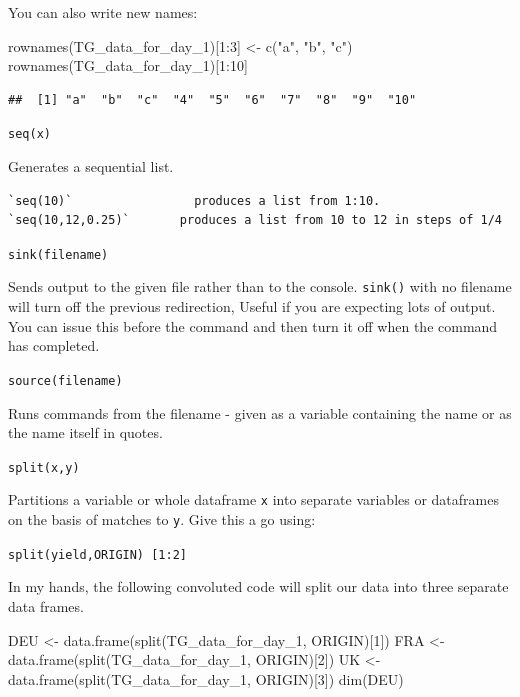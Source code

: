 \documentclass[
]{book}
\newenvironment{Shaded}{\begin{snugshade}}{\end{snugshade}}
\newcommand{\DecValTok}[1]{\textcolor[rgb]{0.00,0.00,0.81}{#1}}
\newcommand{\FunctionTok}[1]{\textcolor[rgb]{0.00,0.00,0.00}{#1}}
\newcommand{\NormalTok}[1]{#1}
\newcommand{\OtherTok}[1]{\textcolor[rgb]{0.56,0.35,0.01}{#1}}
\newcommand{\SpecialCharTok}[1]{\textcolor[rgb]{0.00,0.00,0.00}{#1}}
\newcommand{\StringTok}[1]{\textcolor[rgb]{0.31,0.60,0.02}{#1}}
\begin{document}
You can also write new names:

\begin{Shaded}
\begin{Highlighting}[]
\FunctionTok{rownames}\NormalTok{(TG\_data\_for\_day\_1)[}\DecValTok{1}\SpecialCharTok{:}\DecValTok{3}\NormalTok{] }\OtherTok{\textless{}{-}} \FunctionTok{c}\NormalTok{(}\StringTok{"a"}\NormalTok{, }\StringTok{"b"}\NormalTok{, }\StringTok{"c"}\NormalTok{)}
\FunctionTok{rownames}\NormalTok{(TG\_data\_for\_day\_1)[}\DecValTok{1}\SpecialCharTok{:}\DecValTok{10}\NormalTok{]}
\end{Highlighting}
\end{Shaded}

\begin{verbatim}
##  [1] "a"  "b"  "c"  "4"  "5"  "6"  "7"  "8"  "9"  "10"
\end{verbatim}

\texttt{seq(x)}

Generates a sequential list.

\begin{verbatim}
`seq(10)`                 produces a list from 1:10. 
`seq(10,12,0.25)`       produces a list from 10 to 12 in steps of 1/4
\end{verbatim}

\texttt{sink(filename)}

Sends output to the given file rather than to the console. \texttt{sink()} with no filename will turn off the previous redirection, Useful if you are expecting lots of output. You can issue this before the command and then turn it off when the command has completed.

\texttt{source(filename)}

Runs commands from the filename - given as a variable containing the name or as the name itself in quotes.

\texttt{split(x,y)}

Partitions a variable or whole dataframe \texttt{x} into separate variables or dataframes on the basis of matches to \texttt{y}. Give this a go using:

\texttt{split(yield,ORIGIN)\ {[}1:2{]}}

In my hands, the following convoluted code will split our data into three separate data frames.

\begin{Shaded}
\begin{Highlighting}[]
\NormalTok{DEU }\OtherTok{\textless{}{-}} \FunctionTok{data.frame}\NormalTok{(}\FunctionTok{split}\NormalTok{(TG\_data\_for\_day\_1, ORIGIN)[}\DecValTok{1}\NormalTok{])}
\NormalTok{FRA }\OtherTok{\textless{}{-}} \FunctionTok{data.frame}\NormalTok{(}\FunctionTok{split}\NormalTok{(TG\_data\_for\_day\_1, ORIGIN)[}\DecValTok{2}\NormalTok{])}
\NormalTok{UK }\OtherTok{\textless{}{-}} \FunctionTok{data.frame}\NormalTok{(}\FunctionTok{split}\NormalTok{(TG\_data\_for\_day\_1, ORIGIN)[}\DecValTok{3}\NormalTok{])}
\FunctionTok{dim}\NormalTok{(DEU)}
\end{Highlighting}
\end{Shaded}
\end{document}
